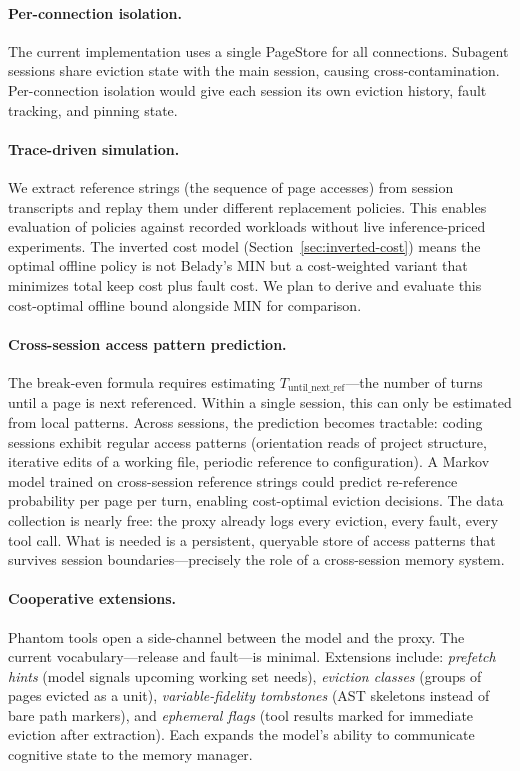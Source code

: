 \paragraph{Per-connection isolation.}
The current implementation uses a single PageStore for all
connections. Subagent sessions share eviction state with the main
session, causing cross-contamination. Per-connection isolation would
give each session its own eviction history, fault tracking, and
pinning state.

\paragraph{Trace-driven simulation.}
We extract reference strings (the sequence of page accesses) from
session transcripts and replay them under different replacement
policies. This enables evaluation of policies against recorded
workloads without live inference-priced experiments. The inverted cost
model (Section~\ref{sec:inverted-cost}) means the optimal offline
policy is not Belady's MIN but a cost-weighted variant that minimizes
total keep cost plus fault cost. We plan to derive and evaluate this
cost-optimal offline bound alongside MIN for comparison.

\paragraph{Cross-session access pattern prediction.}
The break-even formula requires estimating $T_{\text{until\_next\_ref}}$---the
number of turns until a page is next referenced. Within a single
session, this can only be estimated from local patterns. Across
sessions, the prediction becomes tractable: coding sessions exhibit
regular access patterns (orientation reads of project structure,
iterative edits of a working file, periodic reference to configuration).
A Markov model trained on cross-session reference strings could
predict re-reference probability per page per turn, enabling
cost-optimal eviction decisions. The data collection is nearly free:
the proxy already logs every eviction, every fault, every tool call.
What is needed is a persistent, queryable store of access patterns
that survives session boundaries---precisely the role of a cross-session
memory system.

\paragraph{Cooperative extensions.}
Phantom tools open a side-channel between the model and the proxy.
The current vocabulary---release and fault---is minimal. Extensions
include: \emph{prefetch hints} (model signals upcoming working set
needs), \emph{eviction classes} (groups of pages evicted as a unit),
\emph{variable-fidelity tombstones} (AST skeletons instead of bare
path markers), and \emph{ephemeral flags} (tool results marked for
immediate eviction after extraction). Each expands the model's
ability to communicate cognitive state to the memory manager.

